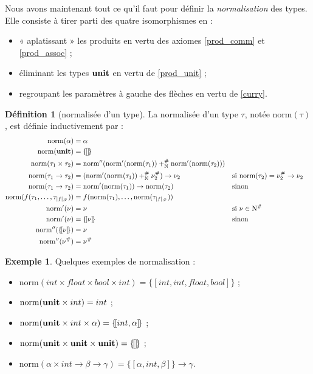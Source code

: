 \documentclass[a4paper]{report}
\theoremstyle{definition}
\newtheorem{definition}[theoreme]{Définition}
\newtheorem{exemple}[theoreme]{Exemple}
\newcommand{\mset}[1]{\{\![#1]\!\}}
\newcommand{\unit}{\bold{unit}}
\newcommand{\norm}{\mathrm{norm}}
\newcommand{\F}{\mathscr{F}}
\newcommand{\N}{\mathrm{N}}
\begin{document}
Nous avons maintenant tout ce qu'il faut pour définir la \emph{normalisation} des types. Elle consiste à tirer parti des quatre isomorphismes en :
\begin{itemize}[nosep]
	\item « aplatissant » les produits en vertu des axiomes \eqref{prod_comm} et \eqref{prod_assoc} ;
	\item éliminant les types $\unit$ en vertu de \eqref{prod_unit} ;
	\item regroupant les paramètres à gauche des flèches en vertu de \eqref{curry}.
\end{itemize}

\begin{definition}[normalisée d'un type]
	La normalisée d'un type $\tau$, notée $\norm (\tau)$, est définie inductivement par :
	\begin{align*}
			\norm (\alpha) &=
			\alpha
		\\
			\norm (\unit) &=
			\mset{}
		\\
			\norm (\tau_1 \times \tau_2) &=
			\norm'' (\norm' (\norm (\tau_1)) +^\#_\N \norm' (\norm (\tau_2)))
		\\
			\norm (\tau_1 \rightarrow \tau_2) &=
			(\norm' (\norm (\tau_1)) +^\#_\N \nu^\#_2) \rightarrow \nu_2 &&
			\text{si } \norm (\tau_2) = \nu^\#_2 \rightarrow \nu_2
		\\
			\norm (\tau_1 \rightarrow \tau_2) &=
			\norm' (\norm (\tau_1)) \rightarrow \norm (\tau_2) &&
			\text{sinon}
		\\
			\norm (f (\tau_1, \dots, \tau_{|f|_\F})) &=
			f (\norm (\tau_1), \dots, \norm (\tau_{|f|_\F}))
		\\
			\norm' (\nu) &=
			\nu &&
			\text{si } \nu \in \N^\#
		\\
			\norm' (\nu) &=
			\mset{\nu} &&
			\text{sinon}
		\\
			\norm'' (\mset{\nu}) &=
			\nu
		\\
			\norm'' (\nu^\#) &=
			\nu^\#
	\end{align*}
\end{definition}

\begin{exemple}
	Quelques exemples de normalisation :
	\begin{itemize}
		\item $\norm (int \times float \times bool \times int) = \mset{int, int, float, bool}$ ;
		\item $\norm (\unit \times int) = int$ ;
		\item $\norm (\unit \times int \times \alpha) = \mset{int, \alpha}$ ;
		\item $\norm (\unit \times \unit \times \unit) = \mset{}$ ;
		\item $\norm (\alpha \times int \rightarrow \beta \rightarrow \gamma) = \mset{\alpha, int, \beta} \rightarrow \gamma$.
	\end{itemize}
\end{exemple}
\end{document}
